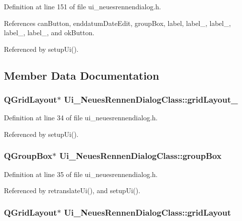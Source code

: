 Definition at line 151 of file ui\_\-neuesrennendialog.h.

References canButton, enddatumDateEdit, groupBox, label, label\_, label\_, label\_, label\_, and okButton.

Referenced by setupUi().

\subsection{Member Data Documentation}
\hypertarget{class_ui___neues_rennen_dialog_class_b7bbe9bfce4cdf51576069669bdfe61e}{
\subsubsection[gridLayout\_\-2]{\setlength{\rightskip}{0pt plus 5cm}QGridLayout$\ast$ {\bf Ui\_\-NeuesRennenDialogClass::gridLayout\_}}}
\label{class_ui___neues_rennen_dialog_class_b7bbe9bfce4cdf51576069669bdfe61e}




Definition at line 34 of file ui\_\-neuesrennendialog.h.

Referenced by setupUi().\hypertarget{class_ui___neues_rennen_dialog_class_b8ed1f394f8fc03f26c2419dd79c6201}{
\subsubsection[groupBox]{\setlength{\rightskip}{0pt plus 5cm}QGroupBox$\ast$ {\bf Ui\_\-NeuesRennenDialogClass::groupBox}}}
\label{class_ui___neues_rennen_dialog_class_b8ed1f394f8fc03f26c2419dd79c6201}




Definition at line 35 of file ui\_\-neuesrennendialog.h.

Referenced by retranslateUi(), and setupUi().\hypertarget{class_ui___neues_rennen_dialog_class_6b613d405d3f82eeec61e6ded0729642}{
\subsubsection[gridLayout]{\setlength{\rightskip}{0pt plus 5cm}QGridLayout$\ast$ {\bf Ui\_\-NeuesRennenDialogClass::gridLayout}}}
\label{class_ui___neues_rennen_dialog_class_6b613d405d3f82eeec61e6ded0729642}





